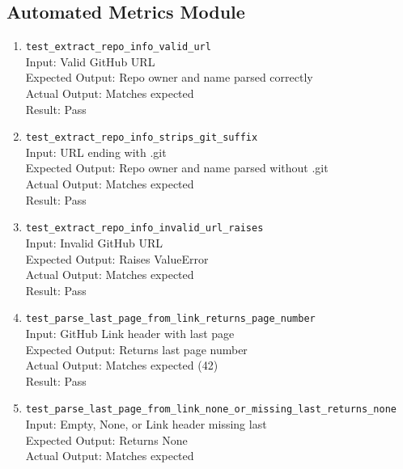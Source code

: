 \documentclass[12pt, titlepage]{article}
\begin{document}
\subsection{Automated Metrics Module}
  \begin{enumerate}
    \item \texttt{test\_extract\_repo\_info\_valid\_url} \label{test-extract-repo-info-valid-url}
      \\Input: Valid GitHub URL
      \\Expected Output: Repo owner and name parsed correctly
      \\Actual Output: Matches expected
      \\Result: Pass
    \item \texttt{test\_extract\_repo\_info\_strips\_git\_suffix} \label{test-extract-repo-info-strips-git-suffix}
      \\Input: URL ending with .git
      \\Expected Output: Repo owner and name parsed without .git
      \\Actual Output: Matches expected
      \\Result: Pass
    \item \texttt{test\_extract\_repo\_info\_invalid\_url\_raises} \label{test-extract-repo-info-invalid-url-raises}
      \\Input: Invalid GitHub URL
      \\Expected Output: Raises ValueError
      \\Actual Output: Matches expected
      \\Result: Pass
    \item \texttt{test\_parse\_last\_page\_from\_link\_returns\_page\_number} \label{test-parse-last-page-from-link-returns-page-number}
      \\Input: GitHub Link header with last page
      \\Expected Output: Returns last page number
      \\Actual Output: Matches expected (42)
      \\Result: Pass
    \item \texttt{test\_parse\_last\_page\_from\_link\_none\_or\_missing\_last\_returns\_none} \label{test-parse-last-page-from-link-none-or-missing-last-returns-none}
      \\Input: Empty, None, or Link header missing last
      \\Expected Output: Returns None
      \\Actual Output: Matches expected

\end{enumerate}
\end{document}
